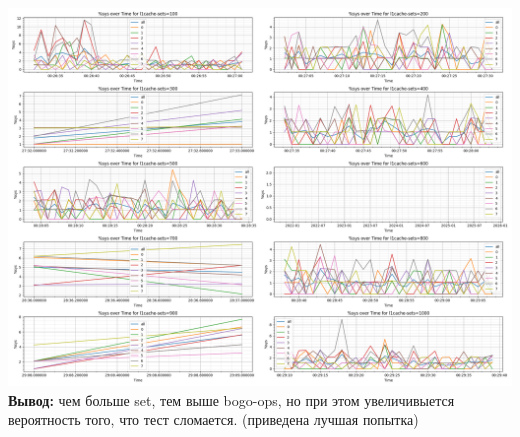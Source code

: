 \includegraphics[width=\textwidth]{./cache/image/l1cache-sets-sys-cpu-2.png}
\textbf{Вывод:} чем больше set, тем выше bogo-ops, но при этом увеличивыется вероятность того, что тест сломается. (приведена лучшая попытка)\\
